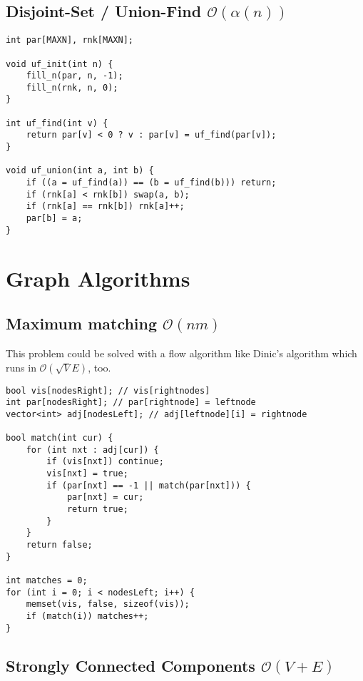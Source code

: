 \documentclass{article}
\begin{document}
\subsection{Disjoint-Set / Union-Find $\mathcal{O}(\alpha (n))$}

\begin{lstlisting}
int par[MAXN], rnk[MAXN];

void uf_init(int n) {
	fill_n(par, n, -1);
	fill_n(rnk, n, 0);
}

int uf_find(int v) {
	return par[v] < 0 ? v : par[v] = uf_find(par[v]);
}

void uf_union(int a, int b) {
	if ((a = uf_find(a)) == (b = uf_find(b))) return;
	if (rnk[a] < rnk[b]) swap(a, b);
	if (rnk[a] == rnk[b]) rnk[a]++;
	par[b] = a;
}
\end{lstlisting}

\section{Graph Algorithms}
\subsection{Maximum matching $\mathcal{O}(n m)$}

This problem could be solved with a flow algorithm like Dinic's algorithm which runs in $\mathcal{O} (\sqrt{V} E)$, too.

\begin{lstlisting}
bool vis[nodesRight]; // vis[rightnodes]
int par[nodesRight]; // par[rightnode] = leftnode
vector<int> adj[nodesLeft]; // adj[leftnode][i] = rightnode

bool match(int cur) {
	for (int nxt : adj[cur]) {
		if (vis[nxt]) continue;
		vis[nxt] = true;
		if (par[nxt] == -1 || match(par[nxt])) {
			par[nxt] = cur;
			return true;
		}
	}
	return false;
}

int matches = 0;
for (int i = 0; i < nodesLeft; i++) {
	memset(vis, false, sizeof(vis));
	if (match(i)) matches++;
}
\end{lstlisting}

\subsection{Strongly Connected Components $\mathcal{O}(V + E)$}
\end{document}
